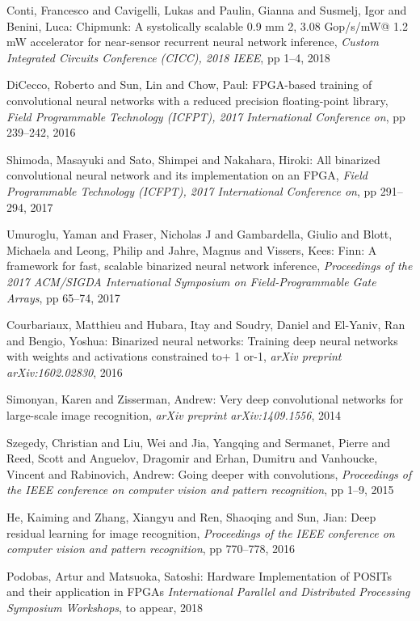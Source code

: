 \documentclass[techrep,english]{ipsj} %
\begin{document}
\begin{thebibliography}{99}
  Conti, Francesco and Cavigelli, Lukas and Paulin, Gianna and Susmelj, Igor and Benini, Luca:
  Chipmunk: A systolically scalable 0.9 mm 2, 3.08 Gop/s/mW@ 1.2 mW accelerator for near-sensor recurrent neural network inference,
  {\it Custom Integrated Circuits Conference (CICC), 2018 IEEE},
  pp 1–4, 2018

  DiCecco, Roberto and Sun, Lin and Chow, Paul:
  FPGA-based training of convolutional neural networks with a reduced precision floating-point library,
  {\it  Field Programmable Technology (ICFPT), 2017 International Conference on},
  pp 239–242, 2016

  Shimoda, Masayuki and Sato, Shimpei and Nakahara, Hiroki:
  All binarized convolutional neural network and its implementation on an FPGA,
  {\it  Field Programmable Technology (ICFPT), 2017 International Conference on},
  pp 291–294, 2017

  Umuroglu, Yaman and Fraser, Nicholas J and Gambardella, Giulio and Blott, Michaela and Leong, Philip and Jahre, Magnus and Vissers, Kees:
  Finn: A framework for fast, scalable binarized neural network inference,
  {\it  Proceedings of the 2017 ACM/SIGDA International Symposium on Field-Programmable Gate Arrays},
  pp 65–74, 2017


  Courbariaux, Matthieu and Hubara, Itay and Soudry, Daniel and El-Yaniv, Ran and Bengio, Yoshua:
  Binarized neural networks: Training deep neural networks with weights and activations constrained to+ 1 or-1,
  {\it arXiv preprint arXiv:1602.02830},
  2016

  Simonyan, Karen and Zisserman, Andrew:
  Very deep convolutional networks for large-scale image recognition,
  {\it arXiv preprint arXiv:1409.1556},
  2014

  Szegedy, Christian and Liu, Wei and Jia, Yangqing and Sermanet, Pierre and Reed, Scott and Anguelov, Dragomir and Erhan, Dumitru and Vanhoucke, Vincent and Rabinovich, Andrew:
  Going deeper with convolutions,
  {\it Proceedings of the IEEE conference on computer vision and pattern recognition},
  pp 1--9, 2015

  He, Kaiming and Zhang, Xiangyu and Ren, Shaoqing and Sun, Jian:
  Deep residual learning for image recognition,
  {\it Proceedings of the IEEE conference on computer vision and pattern recognition},
  pp 770--778, 2016

  Podobas, Artur and Matsuoka, Satoshi:  
  Hardware Implementation of POSITs and their application in FPGAs
  {\it International Parallel and Distributed Processing Symposium Workshops},
  to appear, 2018
  
\end{thebibliography}  
\end{document}
